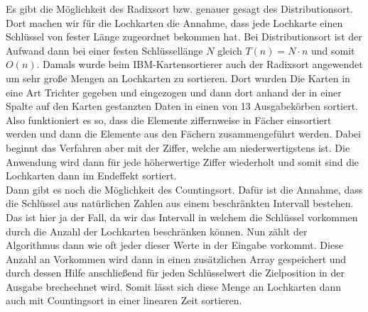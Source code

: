 \documentclass{article}
\begin{document}
    Es gibt die Möglichkeit des Radixsort bzw. genauer gesagt des Distributionsort. Dort machen wir für die Lochkarten die Annahme, dass jede Lochkarte einen Schlüssel von fester Länge zugeordnet bekommen hat. Bei Distributionsort ist der Aufwand dann bei einer festen Schlüssellänge $N$ gleich $T(n)=N\cdot n$ und somit $O(n)$. Damals wurde beim IBM-Kartensortierer auch der Radixsort angewendet um sehr große Mengen an Lochkarten zu sortieren. Dort wurden Die Karten in eine Art Trichter gegeben und eingezogen und dann dort anhand der in einer Spalte auf den Karten gestanzten Daten in einen von 13 Ausgabekörben sortiert. Also funktioniert es so, dass die Elemente ziffernweise in Fächer einsortiert werden und dann die Elemente aus den Fächern zusammengeführt werden. Dabei beginnt das Verfahren aber mit der Ziffer, welche am niederwertigstens ist. Die Anwendung wird dann für jede höherwertige Ziffer wiederholt und somit sind die Lochkarten dann im Endeffekt sortiert.\\
    Dann gibt es noch die Möglichkeit des Countingsort. Dafür ist die Annahme, dass die Schlüssel aus natürlichen Zahlen aus einem beschränkten Intervall bestehen. Das ist hier ja der Fall, da wir das Intervall in welchem die Schlüssel vorkommen durch die Anzahl der Lochkarten beschränken können. Nun zählt der Algorithmus dann wie oft jeder dieser Werte in der Eingabe vorkommt. Diese Anzahl an Vorkommen wird dann in einen zusätzlichen Array gespeichert und durch dessen Hilfe anschließend für jeden Schlüsselwert die Zielposition in der Ausgabe brechechnet wird. Somit lässt sich diese Menge an Lochkarten dann auch mit Countingsort in einer linearen Zeit sortieren.
\end{document}
